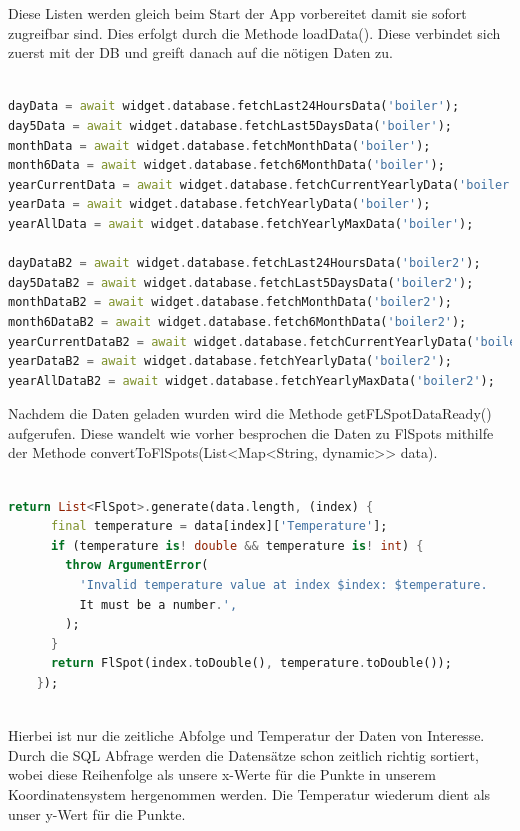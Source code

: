 \documentclass[11pt]{scrartcl}
\begin{document}
Diese Listen werden gleich beim Start der App vorbereitet damit sie sofort zugreifbar sind. Dies erfolgt durch die Methode loadData(). Diese verbindet sich zuerst mit der DB und greift danach auf die nötigen Daten zu.

\begin{lstlisting}[language=Dart]

dayData = await widget.database.fetchLast24HoursData('boiler');
day5Data = await widget.database.fetchLast5DaysData('boiler');
monthData = await widget.database.fetchMonthData('boiler');
month6Data = await widget.database.fetch6MonthData('boiler');
yearCurrentData = await widget.database.fetchCurrentYearlyData('boiler');
yearData = await widget.database.fetchYearlyData('boiler');
yearAllData = await widget.database.fetchYearlyMaxData('boiler');

dayDataB2 = await widget.database.fetchLast24HoursData('boiler2');
day5DataB2 = await widget.database.fetchLast5DaysData('boiler2');
monthDataB2 = await widget.database.fetchMonthData('boiler2');
month6DataB2 = await widget.database.fetch6MonthData('boiler2');
yearCurrentDataB2 = await widget.database.fetchCurrentYearlyData('boiler2');
yearDataB2 = await widget.database.fetchYearlyData('boiler2');
yearAllDataB2 = await widget.database.fetchYearlyMaxData('boiler2');

\end{lstlisting}

Nachdem die Daten geladen wurden wird die Methode getFLSpotDataReady() aufgerufen. Diese wandelt wie vorher besprochen die Daten zu FlSpots mithilfe der Methode convertToFlSpots(List<Map<String, dynamic>> data).

\begin{lstlisting}[language=Dart]

return List<FlSpot>.generate(data.length, (index) {
      final temperature = data[index]['Temperature'];
      if (temperature is! double && temperature is! int) {
        throw ArgumentError(
          'Invalid temperature value at index $index: $temperature.
          It must be a number.',
        );
      }
      return FlSpot(index.toDouble(), temperature.toDouble());
    });
    
\end{lstlisting}

Hierbei ist nur die zeitliche Abfolge und Temperatur der Daten von Interesse. Durch die SQL Abfrage werden die Datensätze schon zeitlich richtig sortiert, wobei diese Reihenfolge als unsere x-Werte für die Punkte in unserem Koordinatensystem hergenommen werden. Die Temperatur wiederum dient als unser y-Wert für die Punkte.
\end{document}
